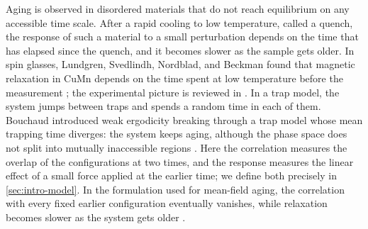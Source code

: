 Aging is observed in disordered materials that do not reach equilibrium on any accessible time scale. After a rapid cooling to low temperature, called a quench, the response of such a material to a small perturbation depends on the time that has elapsed since the quench, and it becomes slower as the sample gets older. In spin glasses, Lundgren, Svedlindh, Nordblad, and Beckman found that magnetic relaxation in CuMn depends on the time spent at low temperature before the measurement \cite{lundgren1983}; the experimental picture is reviewed in \cite{vincent1997}. In a trap model, the system jumps between traps and spends a random time in each of them. Bouchaud introduced weak ergodicity breaking through a trap model whose mean trapping time diverges: the system keeps aging, although the phase space does not split into mutually inaccessible regions \cite[p.~1707]{bouchaud1992}. Here the correlation measures the overlap of the configurations at two times, and the response measures the linear effect of a small force applied at the earlier time; we define both precisely in \cref{sec:intro-model}. In the formulation used for mean-field aging, the correlation with every fixed earlier configuration eventually vanishes, while relaxation becomes slower as the system gets older \cite[arXiv version~1, Section~3]{ck1994}.

